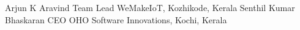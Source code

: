 %
%
%


\begin{referees}
        {Arjun K Aravind}
        {Team Lead}
        {WeMakeIoT, Kozhikode, Kerala}
        \newline
        {Senthil Kumar Bhaskaran}
        {CEO}
        {OHO Software Innovations, Kochi, Kerala}
\end{referees}
